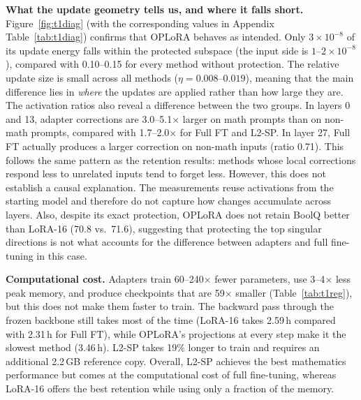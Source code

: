\documentclass{article}
\begin{document}
\textbf{What the update geometry tells us, and where it falls short.} Figure~\ref{fig:t1diag} (with the corresponding values in Appendix Table~\ref{tab:t1diag}) confirms that OPLoRA behaves as intended. Only $3\times10^{-8}$ of its update energy falls within the protected subspace (the input side is $1$--$2\times10^{-8}$), compared with 0.10--0.15 for every method without protection. The relative update size is small across all methods ($\eta=0.008$--$0.019$), meaning that the main difference lies in \emph{where} the updates are applied rather than how large they are. The activation ratios also reveal a difference between the two groups. In layers 0 and 13, adapter corrections are 3.0--5.1$\times$ larger on math prompts than on non-math prompts, compared with 1.7--2.0$\times$ for Full FT and L2-SP. In layer 27, Full FT actually produces a larger correction on non-math inputs (ratio 0.71). This follows the same pattern as the retention results: methods whose local corrections respond less to unrelated inputs tend to forget less. However, this does not establish a causal explanation. The measurements reuse activations from the starting model and therefore do not capture how changes accumulate across layers. Also, despite its exact protection, OPLoRA does not retain BoolQ better than LoRA-16 (70.8 vs.\ 71.6), suggesting that protecting the top singular directions is not what accounts for the difference between adapters and full fine-tuning in this case.

\textbf{Computational cost.} Adapters train 60--240$\times$ fewer parameters, use 3--4$\times$ less peak memory, and produce checkpoints that are 59$\times$ smaller (Table~\ref{tab:t1reg}), but this does not make them faster to train. The backward pass through the frozen backbone still takes most of the time (LoRA-16 takes 2.59\,h compared with 2.31\,h for Full FT), while OPLoRA's projections at every step make it the slowest method (3.46\,h). L2-SP takes 19\% longer to train and requires an additional 2.2\,GB reference copy. Overall, L2-SP achieves the best mathematics performance but comes at the computational cost of full fine-tuning, whereas LoRA-16 offers the best retention while using only a fraction of the memory.
\end{document}
